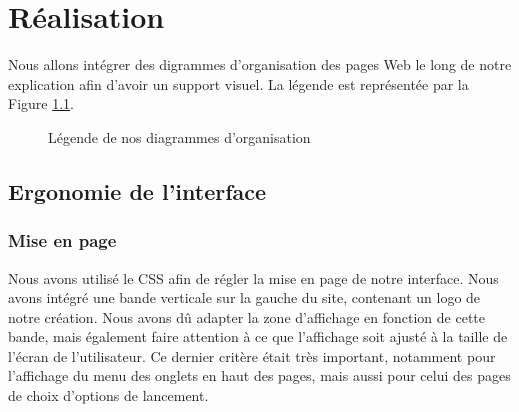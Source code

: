 \chapter{Réalisation}

Nous allons intégrer des digrammes d'organisation des pages Web le long de notre explication afin d'avoir un support visuel. La légende est représentée par la Figure \ref{DiagLegende}.

\begin{figure}[!ht]
	\begin{center}
		\caption{Légende de nos diagrammes d'organisation}
  		\label{DiagLegende}
  	\end{center}	
\end{figure}

\section{Ergonomie de l'interface}

\subsection{Mise en page}
Nous avons utilisé le CSS afin de régler la mise en page de notre interface. Nous avons intégré une bande verticale sur la gauche du site, contenant un logo de notre création. Nous avons dû adapter la zone d'affichage en fonction de cette bande, mais également faire attention à ce que l'affichage soit ajusté à la taille de l'écran de l'utilisateur. Ce dernier critère était très important, notamment pour l'affichage du menu des onglets en haut des pages, mais aussi pour celui des pages de choix d'options de lancement. 

